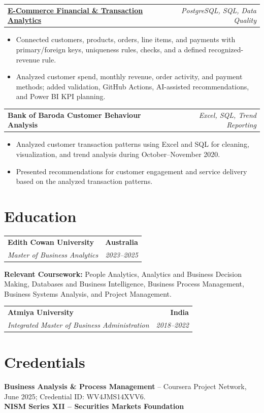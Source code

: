 \documentclass[letterpaper,10pt]{article}
\makeatletter
\newcommand{\role}[4]{%
  \begin{tabularx}{\textwidth}{@{}Xr@{}}
    \textbf{#1} & \textbf{#2} \\
    \textit{#3} & \textit{#4}
  \end{tabularx}\vspace{-1pt}
}
\newcommand{\project}[2]{%
  \begin{tabularx}{\textwidth}{@{}Xr@{}}
    \textbf{#1} & \textit{#2}
  \end{tabularx}\vspace{-1pt}
}
\makeatother
\begin{document}
\project{\href{https://github.com/jainalimehta/Ecommerce-Sales-Analytics}{E-Commerce Financial \& Transaction Analytics}}{PostgreSQL, SQL, Data Quality}
\begin{itemize}
  \item Connected customers, products, orders, line items, and payments with primary/foreign keys, uniqueness rules, checks, and a defined recognized-revenue rule.
  \item Analyzed customer spend, monthly revenue, order activity, and payment methods; added validation, GitHub Actions, AI-assisted recommendations, and Power BI KPI planning.
\end{itemize}
\vspace{1pt}

\project{Bank of Baroda Customer Behaviour Analysis}{Excel, SQL, Trend Reporting}
\begin{itemize}
  \item Analyzed customer transaction patterns using Excel and SQL for cleaning, visualization, and trend analysis during October--November 2020.
  \item Presented recommendations for customer engagement and service delivery based on the analyzed transaction patterns.
\end{itemize}

\section{Education}
\role{Edith Cowan University}{Australia}{Master of Business Analytics}{2023--2025}
\small\textbf{Relevant Coursework:} People Analytics, Analytics and Business Decision Making, Databases and Business Intelligence, Business Process Management, Business Systems Analysis, and Project Management.\\[2pt]
\role{Atmiya University}{India}{Integrated Master of Business Administration}{2018--2022}

\section{Credentials}
\small\textbf{Business Analysis \& Process Management} -- Coursera Project Network, June 2025; Credential ID: WV4JMS14XVV6.\\[-0.2pt]
\small\textbf{NISM Series XII -- Securities Markets Foundation}
\end{document}
